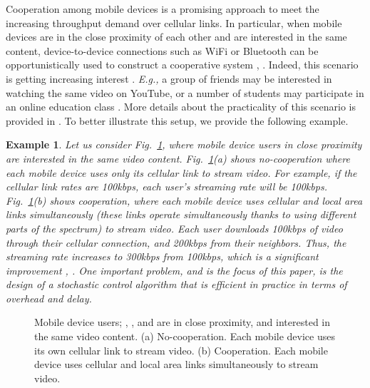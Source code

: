 \documentclass[conference]{IEEEtran}
\newcommand{\Eg}{{\em E.g., }}
\newtheorem{example}{Example}
\begin{document}
Cooperation among mobile devices is a promising approach to meet the increasing throughput demand over cellular links. In particular, when mobile devices are in the close proximity of each other and are interested in the same content, device-to-device connections such as WiFi or Bluetooth can be opportunistically used to construct a cooperative system \cite{microcast}, \cite{microcast_allerton}. Indeed, this scenario is getting increasing interest \cite{microcast}. \Eg a group of friends may be interested in watching the same video on YouTube, or a number of students may participate in an online education class \cite{microcast}. More details about the practicality of this scenario is provided in \cite{microcast}. To better illustrate this setup, we provide the following example.

\begin{example}\label{ex1}
Let us consider Fig.~\ref{fig:intro_example}, where mobile device users in close proximity are interested in the same video content. Fig.~\ref{fig:intro_example}(a) shows no-cooperation where each mobile device uses only its cellular link to stream video. For example, if the cellular link rates are 100kbps, each user's streaming rate will be 100kbps. Fig.~\ref{fig:intro_example}(b) shows cooperation, where each mobile device uses cellular and local area links simultaneously (these links operate simultaneously thanks to using different parts of the spectrum) to stream video. Each user downloads 100kbps of video through their cellular connection, and 200kbps from their neighbors. Thus, the streaming rate increases to 300kbps from 100kbps, which is a significant improvement \cite{microcast}, \cite{microcast_allerton}. One important problem, and is the focus of this paper, is the design of a stochastic control algorithm that is efficient in practice in terms of overhead and delay.
\hfill 
\end{example}


\begin{figure}[t!]
\centering
{} \hspace{10pt}
\vspace{-5pt}
\caption{Mobile device users; , , and  are in close proximity, and interested in the same video content. (a) No-cooperation. Each mobile device uses its own cellular link to stream video. (b) Cooperation. Each mobile device uses cellular and local area links simultaneously to stream video.
}
\vspace{-10pt}
\label{fig:intro_example}
\end{figure}
\end{document}

